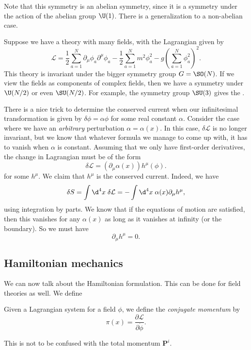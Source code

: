 \documentclass[a4paper]{article}
\begin{document}
Note that this symmetry is an abelian symmetry, since it is a symmetry under the action of the abelian group $\U(1)$. There is a generalization to a non-abelian case.

\begin{eg}
  Suppose we have a theory with many fields, with the Lagrangian given by
  \[
    \mathcal{L} = \frac{1}{2} \sum_{a = 1}^N \partial_\mu \phi_a \partial^\mu \phi_a - \frac{1}{2} \sum_{a = 1}^N m^2 \phi_a^2 - g \left(\sum_{a = 1}^N \phi_a^2\right)^2.
  \]
  This theory is invariant under the bigger symmetry group $G = \SO(N)$. If we view the fields as components of complex fields, then we have a symmetry under $\U(N/2)$ or even $\SU(N/2)$. For example, the symmetry group $\SU(3)$ gives the .
\end{eg}

\begin{eg}
  There is a nice trick to determine the conserved current when our infinitesimal transformation is given by $\delta \phi = \alpha \phi$ for some real constant $\alpha$. Consider the case where we have an \emph{arbitrary} perturbation $\alpha = \alpha(x)$. In this case, $\delta\mathcal{L}$ is no longer invariant, but we know that whatever formula we manage to come up with, it has to vanish when $\alpha$ is constant. Assuming that we only have first-order derivatives, the change in Lagrangian must be of the form
  \[
    \delta \mathcal{L} = (\partial_\mu \alpha(x)) h^\mu(\phi).
  \]
  for some $h^\mu$. We claim that $h^\mu$ is the conserved current. Indeed, we have
  \[
    \delta S = \int \d^4 x\; \delta \mathcal{L} = - \int \d^4 x\; \alpha(x) \partial_\mu h^\mu,
  \]
  using integration by parts. We know that if the equations of motion are satisfied, then this vanishes for any $\alpha(x)$ as long as it vanishes at infinity (or the boundary). So we must have
  \[
    \partial_\mu h^\mu = 0.
  \]
\end{eg}

\subsection{Hamiltonian mechanics}
We can now talk about the Hamiltonian formulation. This can be done for field theories as well. We define
\begin{defi}
  Given a Lagrangian system for a field $\phi$, we define the \emph{conjugate momentum} by
  \[
    \pi(x) = \frac{\partial \mathcal{L}}{\partial \dot{\phi}}.
  \]
\end{defi}
This is not to be confused with the total momentum $\mathbf{P}^i$.
\end{document}
